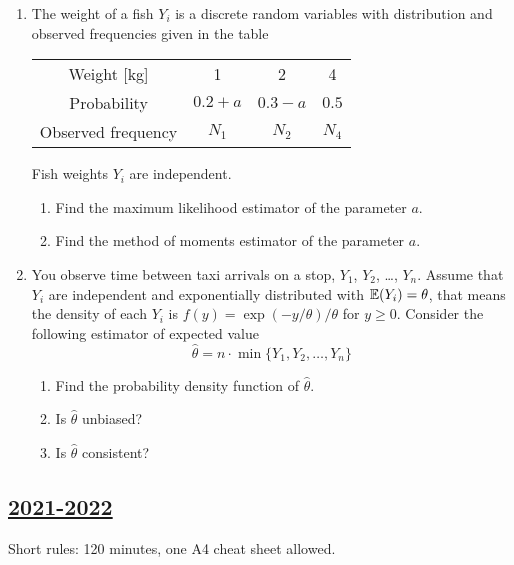 \begin{enumerate}
    \item The weight of a fish $Y_i$ is a discrete random variables with 
    distribution and observed frequencies given in the table 
    
    \begin{tabular}{cccc}
        \toprule
        Weight [kg] & 1 & 2 & 4 \\
        Probability & $0.2 + a$ & $0.3 - a$ & $0.5$ \\
        Observed frequency & $N_1$ & $N_2$ & $N_4$ \\
        \bottomrule
    \end{tabular}
    
    Fish weights $Y_i$ are independent. 
    
    \begin{enumerate}
        \item Find the maximum likelihood estimator of the parameter $a$. 
        \item Find the method of moments estimator of the parameter $a$. 
    \end{enumerate}
        
    \item You observe time between taxi arrivals on a stop, $Y_1$, $Y_2$, \ldots, $Y_n$.
    Assume that $Y_i$ are independent and exponentially distributed with $\operatorname{\mathbb{E}}(Y_i) = \theta$, 
    that means the density of each $Y_i$ is $f(y) = \exp(-y/\theta)/\theta$ for $y\geq 0$. 
    Consider the following estimator of expected value
    \[
    \hat \theta = n \cdot \min\{Y_1, Y_2, \dots, Y_n \}    
    \]
    \begin{enumerate}
        \item Find the probability density function of $\hat \theta$. 
        \item Is $\hat \theta$ unbiased?
        \item Is $\hat \theta$ consistent?
    \end{enumerate}
    
    
\end{enumerate}
    



\subsection[2021-2022]{\hyperref[sec:sol_kr_03_2021_2022]{2021-2022}}
\label{sec:kr_03_2021_2022} %

Short rules: 120 minutes, one A4 cheat sheet allowed. 

